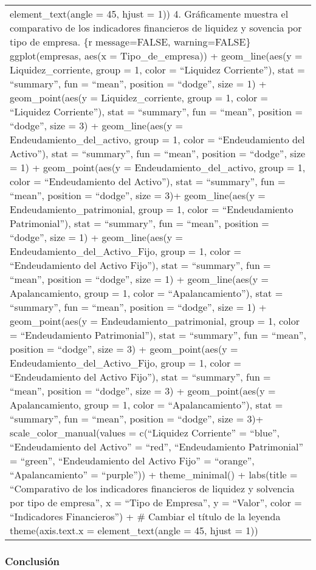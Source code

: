 \documentclass[
]{article}
\begin{document}
\begin{longtable}[]{@{}
  >{\raggedright\arraybackslash}p{}@{}}
element\_text(angle = 45, hjust = 1)) 4. Gráficamente muestra el
comparativo de los indicadores financieros de liquidez y sovencia por
tipo de empresa. \{r message=FALSE, warning=FALSE\} ggplot(empresas,
aes(x = Tipo\_de\_empresa)) + geom\_line(aes(y = Liquidez\_corriente,
group = 1, color = ``Liquidez Corriente''), stat = ``summary'', fun =
``mean'', position = ``dodge'', size = 1) + geom\_point(aes(y =
Liquidez\_corriente, group = 1, color = ``Liquidez Corriente''), stat =
``summary'', fun = ``mean'', position = ``dodge'', size = 3) +
geom\_line(aes(y = Endeudamiento\_del\_activo, group = 1, color =
``Endeudamiento del Activo''), stat = ``summary'', fun = ``mean'',
position = ``dodge'', size = 1) + geom\_point(aes(y =
Endeudamiento\_del\_activo, group = 1, color = ``Endeudamiento del
Activo''), stat = ``summary'', fun = ``mean'', position = ``dodge'',
size = 3)+ geom\_line(aes(y = Endeudamiento\_patrimonial, group = 1,
color = ``Endeudamiento Patrimonial''), stat = ``summary'', fun =
``mean'', position = ``dodge'', size = 1) + geom\_line(aes(y =
Endeudamiento\_del\_Activo\_Fijo, group = 1, color = ``Endeudamiento del
Activo Fijo''), stat = ``summary'', fun = ``mean'', position =
``dodge'', size = 1) + geom\_line(aes(y = Apalancamiento, group = 1,
color = ``Apalancamiento''), stat = ``summary'', fun = ``mean'',
position = ``dodge'', size = 1) + geom\_point(aes(y =
Endeudamiento\_patrimonial, group = 1, color = ``Endeudamiento
Patrimonial''), stat = ``summary'', fun = ``mean'', position =
``dodge'', size = 3) + geom\_point(aes(y =
Endeudamiento\_del\_Activo\_Fijo, group = 1, color = ``Endeudamiento del
Activo Fijo''), stat = ``summary'', fun = ``mean'', position =
``dodge'', size = 3) + geom\_point(aes(y = Apalancamiento, group = 1,
color = ``Apalancamiento''), stat = ``summary'', fun = ``mean'',
position = ``dodge'', size = 3)+ scale\_color\_manual(values =
c(``Liquidez Corriente'' = ``blue'', ``Endeudamiento del Activo'' =
``red'', ``Endeudamiento Patrimonial'' = ``green'', ``Endeudamiento del
Activo Fijo'' = ``orange'', ``Apalancamiento'' = ``purple'')) +
theme\_minimal() + labs(title = ``Comparativo de los indicadores
financieros de liquidez y solvencia por tipo de empresa'', x = ``Tipo de
Empresa'', y = ``Valor'', color = ``Indicadores Financieros'') + \#
Cambiar el título de la leyenda theme(axis.text.x = element\_text(angle
= 45, hjust = 1)) \\
\end{longtable}

\hypertarget{conclusiuxf3n}{%
\subsubsection{Conclusión}\label{conclusiuxf3n}}
\end{document}
